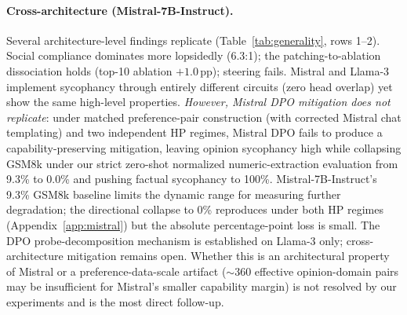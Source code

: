 \documentclass{article}
\begin{document}
\paragraph{Cross-architecture (Mistral-7B-Instruct).} Several architecture-level findings replicate (Table~\ref{tab:generality}, rows 1--2). Social compliance dominates more lopsidedly (6.3:1); the patching-to-ablation dissociation holds (top-10 ablation $+1.0$\,pp); steering fails. Mistral and Llama-3 implement sycophancy through entirely different circuits (zero head overlap) yet show the same high-level properties. \emph{However, Mistral DPO mitigation does not replicate}: under matched preference-pair construction (with corrected Mistral chat templating) and two independent HP regimes, Mistral DPO fails to produce a capability-preserving mitigation, leaving opinion sycophancy high while collapsing GSM8k under our strict zero-shot normalized numeric-extraction evaluation from 9.3\% to 0.0\% and pushing factual sycophancy to 100\%. Mistral-7B-Instruct's 9.3\% GSM8k baseline limits the dynamic range for measuring further degradation; the directional collapse to 0\% reproduces under both HP regimes (Appendix~\ref{app:mistral}) but the absolute percentage-point loss is small. The DPO probe-decomposition mechanism is established on Llama-3 only; cross-architecture mitigation remains open. Whether this is an architectural property of Mistral or a preference-data-scale artifact ($\sim$360 effective opinion-domain pairs may be insufficient for Mistral's smaller capability margin) is not resolved by our experiments and is the most direct follow-up.
\end{document}
